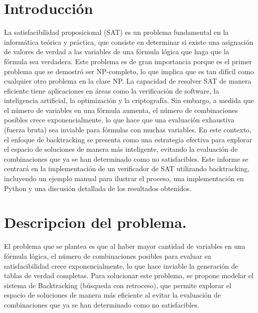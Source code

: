 \documentclass[12pt,a4paper]{article}
\begin{document}

\section{Introducción}

La satisfacibilidad proposicional (SAT) es un problema fundamental en la informática teórica y práctica, que consiste en determinar si existe una asignación de valores de verdad a las variables de una fórmula lógica que haga que la fórmula sea verdadera. Este problema es de gran importancia porque es el primer problema que se demostró ser NP-completo, lo que implica que es tan difícil como cualquier otro problema en la clase NP. La capacidad de resolver SAT de manera eficiente tiene aplicaciones en áreas como la verificación de software, la inteligencia artificial, la optimización y la criptografía. Sin embargo, a medida que el número de variables en una fórmula aumenta, el número de combinaciones posibles crece exponencialmente, lo que hace que una evaluación exhaustiva (fuerza bruta) sea inviable para fórmulas con muchas variables. En este contexto, el enfoque de backtracking se presenta como una estrategia efectiva para explorar el espacio de soluciones de manera más inteligente, evitando la evaluación de combinaciones que ya se han determinado como no satisfacibles. Este informe se centrará en la implementación de un verificador de SAT utilizando backtracking, incluyendo un ejemplo manual para ilustrar el proceso, una implementación en Python y una discusión detallada de los resultados obtenidos.



\section{Descripcion del problema.}
El problema que se plantea es que al haber mayor cantidad de variables en una fórmula lógica, el número de combinaciones posibles para evaluar su satisfacibilidad crece exponencialmente, lo que hace inviable la generación de tablas de verdad completas. Para solucionar este problema, se propone modelar el sistema de Backtracking (búsqueda con retroceso), que permite explorar el espacio de soluciones de manera más eficiente al evitar la evaluación de combinaciones que ya se han determinado como no satisfacibles.
\end{document}
